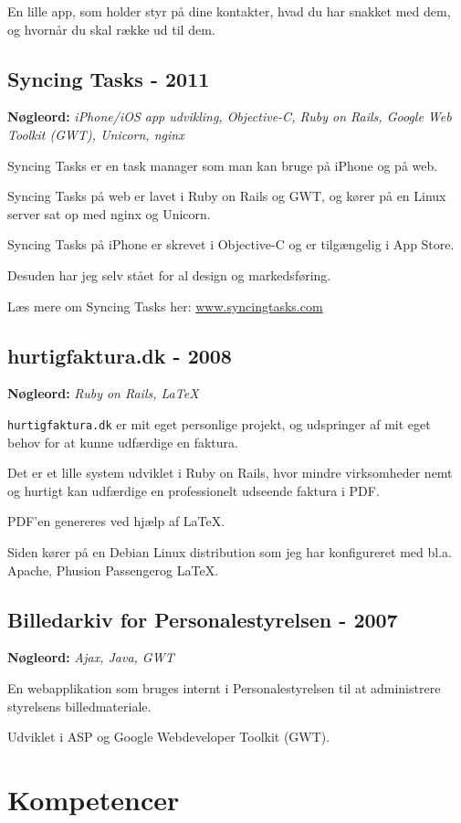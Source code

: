 \documentclass[a4paper]{article}
\newcommand{\keywords}[1]{\small\textbf{Nøgleord:} \emph{#1}\normalsize}
\begin{document}
En lille app, som holder styr på dine kontakter, hvad du har snakket med dem, og hvornår du skal række ud til dem.

\subsection*{Syncing Tasks - 2011}
\keywords{iPhone/iOS app udvikling, Objective-C, Ruby on Rails, Google Web Toolkit (GWT), Unicorn, nginx}

Syncing Tasks er en task manager som man kan bruge på iPhone og på web. 

Syncing Tasks på web er lavet i Ruby on Rails og GWT, og kører på en Linux server sat op med nginx og Unicorn.

Syncing Tasks på iPhone er skrevet i Objective-C og er tilgængelig i App Store.

Desuden har jeg selv stået for al design og markedsføring.

Læs mere om Syncing Tasks her: \href{http://www.syncingtasks.com}{www.syncingtasks.com}

\subsection*{hurtigfaktura.dk - 2008}
\keywords{Ruby on Rails, \LaTeX}

\texttt{hurtigfaktura.dk} er mit eget personlige projekt, og udspringer af mit eget behov for at kunne udfærdige en faktura.

Det er et lille system udviklet i Ruby on Rails, hvor mindre virksomheder nemt og hurtigt kan udfærdige en professionelt udseende faktura i PDF.

PDF'en genereres ved hjælp af \LaTeX.

Siden kører på en Debian Linux distribution som jeg har konfigureret med bl.a. Apache, Phusion Passenger\texttrademark og \LaTeX.


\subsection*{Billedarkiv for Personalestyrelsen - 2007} 
\keywords{Ajax, Java, GWT}

En webapplikation som bruges internt i Personalestyrelsen til at administrere styrelsens billedmateriale.

Udviklet i ASP og Google Webdeveloper Toolkit (GWT).

\section*{Kompetencer}
\end{document}
